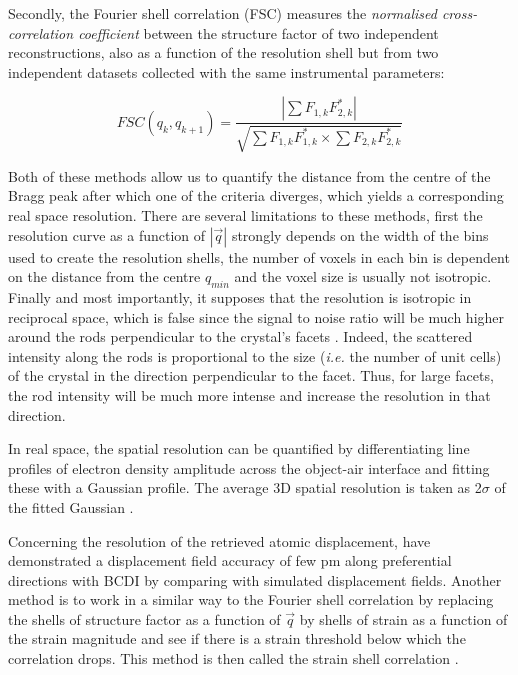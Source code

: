 Secondly, the Fourier shell correlation (FSC) \parencite{van_heel_fourier_2005} measures the \textit{normalised cross-correlation coefficient} between the structure factor of two independent reconstructions, also as a function of the resolution shell but from two independent datasets collected with the same instrumental parameters:

\begin{equation}
    FSC(q_k, q_{k+1}) = \frac{ |\sum F_{1,k} F_{2,k}^*| }{\sqrt{ \sum F_{1,k} F_{1,k}^* \times \sum F_{2,k} F_{2,k}^*}}
\end{equation}

Both of these methods allow us to quantify the distance from the centre of the Bragg peak after which one of the criteria diverges, which yields a corresponding real space resolution.
There are several limitations to these methods, first the resolution curve as a function of $|\vec{q}|$ strongly depends on the width of the bins used to create the resolution shells, the number of voxels in each bin is dependent on the distance from the centre $q_{min}$ and the voxel size is usually not isotropic.
Finally and most importantly, it supposes that the resolution is isotropic in reciprocal space, which is false since the signal to noise ratio will be much higher around the rods perpendicular to the crystal's facets \parencite{cherukara_anisotropic_2018}.
Indeed, the scattered intensity along the rods is proportional to the size (\textit{i.e.} the number of unit cells) of the crystal in the direction perpendicular to the facet.
Thus, for large facets, the rod intensity will be much more intense and increase the resolution in that direction.

In real space, the spatial resolution can be quantified by differentiating line profiles of electron density amplitude across the object-air interface and fitting these with a Gaussian profile.
The average 3D spatial resolution is taken as 2$\sigma$ of the fitted Gaussian \parencite{hofmann_nanoscale_2020}.

Concerning the resolution of the retrieved atomic displacement, \cite{labat_inversion_2015} have demonstrated a displacement field accuracy of few pm along preferential directions with BCDI by comparing with simulated displacement fields.
Another method is to work in a similar way to the Fourier shell correlation by replacing the shells of structure factor as a function of $\vec{q}$ by shells of strain as a function of the strain magnitude and see if there is a strain threshold below which the correlation drops.
This method is then called the strain shell correlation \parencite{Girard2020}.

